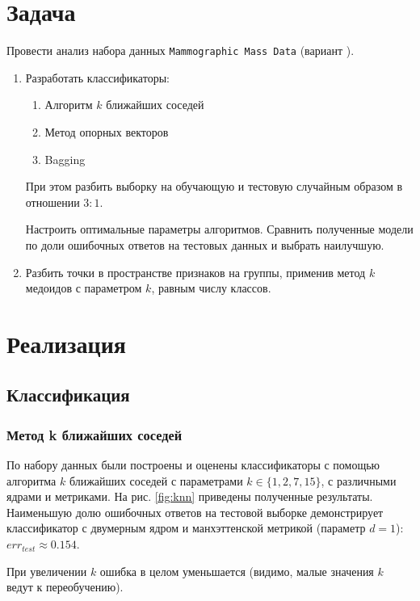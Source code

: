 \documentclass[a4paper,12pt]{article} %
\begin{document}


\section{Задача}

Провести анализ набора данных \texttt{Mammographic Mass Data} (вариант ).

\begin{enumerate}[noitemsep]
    \item Разработать классификаторы:
    \begin{enumerate}[noitemsep]
        \item Алгоритм $k$ ближайших соседей
        \item Метод опорных векторов
        \item Bagging
    \end{enumerate}
    При этом разбить выборку на обучающую и тестовую случайным образом в отношении $ 3:1 $.

    Настроить оптимальные параметры алгоритмов.
    Сравнить полученные модели по доли ошибочных ответов на тестовых данных и выбрать наилучшую.
    \item Разбить точки в пространстве признаков на группы, применив метод $ k $ медоидов с параметром $ k $, равным числу классов.

\end{enumerate}

\newpage
\section{Реализация}
\subsection{Классификация} \label{section:classification}
\subsubsection{Метод k ближайших соседей}

По набору данных были построены и оценены классификаторы с помощью алгоритма $ k $ ближайших соседей с параметрами $ k \in \{1, 2, 7, 15\} $, с различными ядрами и метриками.
На рис. \ref{fig:knn} приведены полученные результаты.
Наименьшую долю ошибочных ответов на тестовой выборке демонстрирует классификатор с двумерным ядром и манхэттенской метрикой (параметр $ d = 1 $): $err_{test} \approx 0.154$.

При увеличении $ k $ ошибка в целом уменьшается (видимо, малые значения $ k $ ведут к переобучению).
\end{document}
